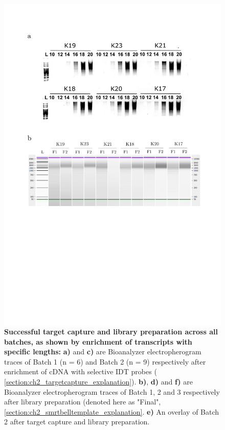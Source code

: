 \begin{figure}[htp]
	\label{fig:isoseq_targeted_pccresults}
\end{figure}


\begin{figure}[!htp]
	\centering
	\vspace{20pt}
	\includegraphics[page=2,trim={0 14cm 3cm 1cm},clip,scale = 0.45]{Figures/TargetedLabResults.pdf}
	\captionsetup{width=0.95\textwidth}
	\caption[Iso-Seq Targeted Transcriptome - Target Capture and library preparation]%
	{\textbf{Successful target capture and library preparation across all batches, as shown by enrichment of transcripts with specific lengths:} \textbf{a)} and \textbf{c)} are Bioanalyzer electropherogram traces of Batch 1 (n = 6) and Batch 2 (n = 9) respectively after enrichment of cDNA with selective IDT probes ( \cref{section:ch2_targetcapture_explanation}). \textbf{b)}, \textbf{d)} and \textbf{f)} are Bioanalyzer electropherogram traces of Batch 1, 2 and 3 respectively after library preparation (denoted here as "Final", \cref{section:ch2_smrtbelltemplate_explanation}. \textbf{e)} An overlay of Batch 2 after target capture and library preparation. 
}
\end{figure}
